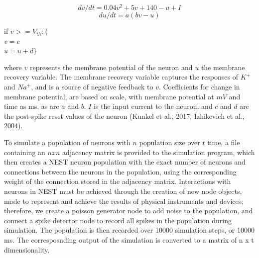 \documentclass[11pt]{article}
\begin{document}
$$dv/dt=0.04v^2+5v+140-u+I$$
$$du/dt=a(bv-u)$$
\smallskip

{\centering
if $v >= V_{th}:\{$\\
$v = c$\\
$u = u + d\}$\par
}
where $v$ represents the membrane potential of the neuron and $u$ the membrane recovery variable. The membrane recovery variable captures the responses of $K^{+}$ and $Na^{+}$, and is a source of negative feedback to $v$. Coefficients for change in membrane potential, are based on scale, with membrane potential at $mV$ and time as ms, as are $a$ and $b$. $I$ is the input current to the neuron, and $c$ and $d$ are the post-spike reset values of the neuron (Kunkel et al., 2017, Izhikevich et al., 2004). 

To simulate a population of neurons with $n$ population size over $t$ time, a file containing an $n x n$ adjacency matrix is provided to the simulation program, which then creates a NEST neuron population with the exact number of neurons and connections between the neurons in the population, using the corresponding weight of the connection stored in the adjacency matrix. Interactions with neurons in NEST must be achieved through the creation of new node objects, made to represent and achieve the results of physical instruments and devices; therefore, we create a poisson generator node to add noise to the population, and connect a spike detector node to record all spikes in the population during simulation. The population is then recorded over 10000 simulation steps, or 10000 ms. The corresposnding output of the simulation is converted to a matrix of n x t dimensionality.\par
\end{document}
